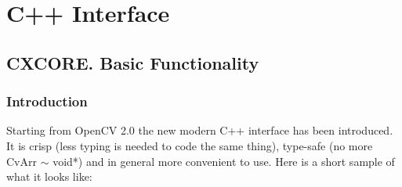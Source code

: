 \chapter{C++ Interface}

\section{CXCORE. Basic Functionality}

\subsection{Introduction}

Starting from OpenCV 2.0 the new modern C++ interface has been introduced.
It is crisp (less typing is needed to code the same thing), type-safe (no more CvArr $\sim$ void*)
and in general more convenient to use. Here is a short sample of what it looks like:

